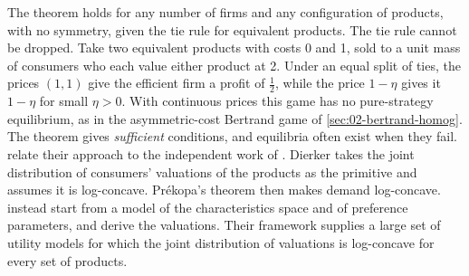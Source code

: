The theorem holds for any number of firms and any configuration of products, with no symmetry, given the tie rule
for equivalent products. The tie rule cannot be dropped. Take two equivalent products with costs 0 and 1, sold to
a unit mass of consumers who each value either product at 2. Under an equal split of ties, the prices $(1, 1)$
give the efficient firm a profit of $\frac{1}{2}$, while the price $1 - \eta$ gives it $1 - \eta$ for small
$\eta > 0$. With continuous prices this game has no pure-strategy equilibrium, as in the asymmetric-cost Bertrand
game of \cref{sec:02-bertrand-homog}. The theorem gives
\emph{sufficient} conditions, and equilibria often exist when they fail. \citet[p.~15]{CaplinNalebuff1991} relate
their approach to the independent work of \citet{Dierker1989}. Dierker takes the joint distribution of consumers'
valuations of the products as the primitive and assumes it is log-concave. Pr\'ekopa's theorem then makes demand
log-concave. \citet{CaplinNalebuff1991} instead start from a model of the characteristics space and of preference
parameters, and derive the valuations. Their framework supplies a large set of utility models for which the
joint distribution of valuations is log-concave for every set of products.

